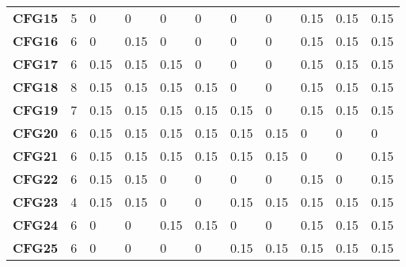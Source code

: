 \documentclass[final,1p]{elsarticle}
\begin{document}
\begin{table}[h!]
\begin{tabularx}{20cm}{cc*{9}{X}}
\textbf{CFG15}			& 5											&0						&0						&0						&0					&0					&0						&0.15					&0.15		&0.15	\\
\textbf{CFG16}			& 6											&0						&0.15					&0						&0					&0					&0						&0.15					&0.15		&0.15	\\
\textbf{CFG17}			& 6											&0.15					&0.15					&0.15					&0					&0					&0						&0.15					&0.15		&0.15	\\
\textbf{CFG18}			& 8											&0.15					&0.15					&0.15					&0.15				&0					&0						&0.15					&0.15		&0.15	\\
\textbf{CFG19}			& 7											&0.15					&0.15					&0.15					&0.15				&0.15				&0						&0.15					&0.15		&0.15	\\
\textbf{CFG20}			& 6											&0.15					&0.15					&0.15					&0.15				&0.15				&0.15					&0						&0			&0		\\
\textbf{CFG21}			& 6 											&0.15					&0.15					&0.15					&0.15				&0.15				&0.15					&0						&0			&0.15	\\
\textbf{CFG22}			& 6											&0.15					&0.15					&0						&0					&0					&0						&0.15					&0			&0.15	\\
\textbf{CFG23}			& 4											&0.15					&0.15					&0						&0					&0.15				&0.15					&0.15					&0.15		&0.15	\\
\textbf{CFG24}			& 6 											&0						&0						&0.15					&0.15				&0					&0						&0.15					&0.15		&0.15	\\
\textbf{CFG25}			& 6											&0						&0						&0						&0					&0.15				&0.15					&0.15					&0.15		&0.15	\\
\bottomrule
\end{tabularx}
\normalsize
\label{tab:Carac25CFG}
\end{table}
\end{document}
